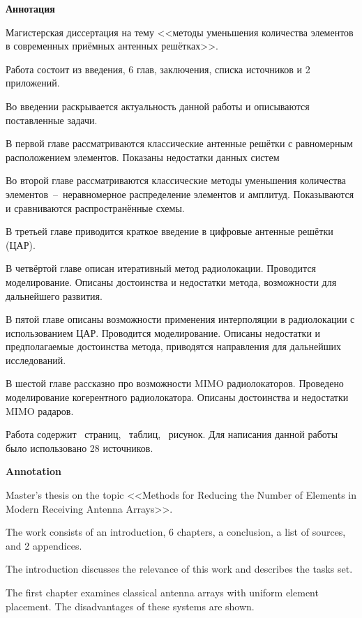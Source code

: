 {\Large\normalfont\bfseries \hfil Аннотация}
\vspace{1em}
\thispagestyle{empty}

Магистерская диссертация на тему <<методы уменьшения количества элементов в современных приёмных антенных решётках>>.

Работа состоит из введения, 6 глав, заключения, списка источников и 2 приложений.

Во введении раскрывается актуальность данной работы и описываются поставленные задачи.

В первой главе рассматриваются классические антенные решётки с равномерным расположением элементов. Показаны недостатки данных систем

Во второй главе рассматриваются классические методы уменьшения количества элементов~--~неравномерное распределение
элементов и амплитуд. Показываются и сравниваются распространённые схемы.

В третьей главе приводится краткое введение в цифровые антенные решётки (ЦАР).

В четвёртой главе описан итеративный метод радиолокации.
Проводится моделирование.
Описаны достоинства и недостатки метода, возможности для дальнейшего развития.

В пятой главе описаны возможности применения интерполяции в радиолокации с использованием ЦАР. 
Проводится моделирование. Описаны недостатки и предполагаемые достоинства метода,
приводятся направления для дальнейших исследований.

В шестой главе рассказно про возможности MIMO радиолокаторов. Проведено моделирование когерентного радиолокатора. 
Описаны достоинства и недостатки MIMO радаров. 

Работа содержит~\pageref*{LastPage} страниц, \totaltables~таблиц, \totalfigures~рисунок.
Для написания данной работы было использовано 28 источников.


\newpage
{\Large\normalfont\bfseries \hfil Annotation}
\vspace{1em}
\thispagestyle{empty}

Master's thesis on the topic <<Methods for Reducing the Number of Elements in Modern Receiving Antenna Arrays>>.

The work consists of an introduction, 6 chapters, a conclusion, a list of sources, and 2 appendices.

The introduction discusses the relevance of this work and describes the tasks set.

The first chapter examines classical antenna arrays with uniform element placement.
The disadvantages of these systems are shown.

